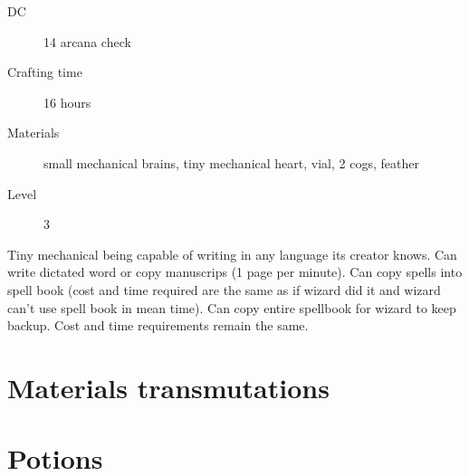 \begin{description}
\item [DC] 14 arcana check
\item [Crafting time] 16 hours
\item [Materials] small mechanical brains, tiny mechanical heart, vial, 2 cogs, feather
\item [Level] 3
\end{description}

Tiny mechanical being capable of writing in any language its creator knows. Can write dictated word or copy manuscrips (1 page per minute). Can copy spells into spell book (cost and time required are the same as if wizard did it and wizard can't use spell book in mean time). Can copy entire spellbook for wizard to keep backup. Cost and time requirements remain the same. 

\section{Materials transmutations}

\section{Potions}